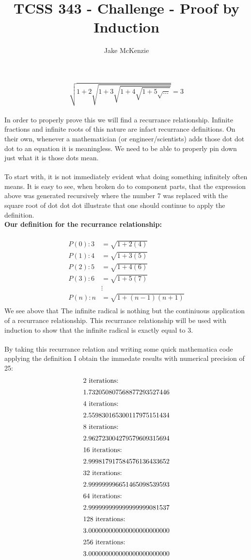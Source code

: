 \documentclass[12pt]{article}
\begin{document}
\title{TCSS 343 - Challenge - Proof by Induction}
\author{Jake McKenzie}
\maketitle
\[\sqrt{1+2\sqrt{1+3\sqrt{1+4\sqrt{1+5\sqrt{\dots}}}}} = 3\]\\
In order to properly prove this we will find a recurrance relationship. Infinite fractions and infinite roots of this nature are infact recurrance definitions. On their own, whenever a mathematician (or engineer/scientists) adds those dot dot dot to an equation it is meaningless. We need to be able to properly pin down just what it is those dots mean. \\\\
To start with, it is not immediately evident what doing something infinitely often means. It is easy to see, when broken do to component parts, that the expression above was generated recursively where the number 7 was replaced with the square root of dot dot dot illustrate that one should continue to apply the definition. \\
\textbf{Our definition for the recurrance relationship:}\\\\
\begin{align*}
P(0):3 &= \sqrt{1+2(4)}\\
P(1):4 &= \sqrt{1+3(5)}\\
P(2):5 &= \sqrt{1+4(6)}\\
P(3):6 &= \sqrt{1+5(7)}\\
&\vdots\\
P(n):n &= \sqrt{1+(n-1)(n+1)}\\
\end{align*}
We see above that The infinite radical is nothing but the continiuous application of a recurrance relationship. This recurrance relationship will be used with induction to show that the infinite radical is exactly equal to 3.\\\\
By taking this recurrance relation and writing some quick mathematica code applying the definition I obtain the immedate results with numerical precision of 25:
\begin{align*}
\intertext{2 iterations:} & 1.732050807568877293527446\\
\intertext{4 iterations:} & 2.559830165300117975151434\\
\intertext{8 iterations:} & 2.962723004279579609315694\\
\intertext{16 iterations:} & 2.999817917584576136433652\\
\intertext{32 iterations:} & 2.999999996651465098539593\\
\intertext{64 iterations:} & 2.999999999999999999081537\\
\intertext{128 iterations:} & 3.000000000000000000000000\\
\intertext{256 iterations:} & 3.000000000000000000000000\\
\end{align*}
\end{document}
